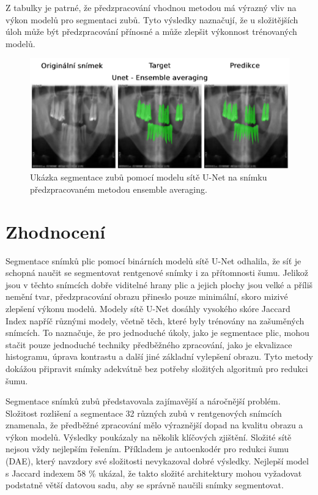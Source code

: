 \documentclass[male,czech,api_ing]{thesis}
\begin{document}
Z tabulky je patrné, že předzpracování vhodnou metodou má výrazný vliv na výkon modelů pro segmentaci zubů. Tyto výsledky naznačují, že u složitějších úloh může být předzpracování přínosné a může zlepšit výkonnost trénovaných modelů.

\begin{figure}[h]
    \centering
    \includegraphics[width=\linewidth]{Prilohy/Obrazky/MulticlassUnetEnsemble.png}
    \caption{Ukázka segmentace zubů pomocí modelu sítě U-Net na snímku předzpracovaném metodou ensemble averaging.}
    \label{fig:MulticlassUnet}
\end{figure}

\chapter{Zhodnocení} 
Segmentace snímků plic pomocí binárních modelů sítě U-Net odhalila, že síť je schopná naučit se segmentovat rentgenové snímky i za přítomnosti šumu. Jelikož jsou v těchto snímcích dobře viditelné hrany plic a jejich plochy jsou velké a příliš nemění tvar, předzpracování obrazu přineslo pouze minimální, skoro mizivé zlepšení výkonu modelů. Modely sítě U-Net dosáhly vysokého skóre Jaccard Index napříč různými modely, včetně těch, které byly trénovány na zašuměných snímcích. To naznačuje, že pro jednoduché úkoly, jako je segmentace plic, mohou stačit pouze jednoduché techniky předběžného zpracování, jako je ekvalizace histogramu, úprava kontrastu a další jiné základní vylepšení obrazu. Tyto metody dokážou připravit snímky adekvátně bez potřeby složitých algoritmů pro redukci šumu.

Segmentace snímků zubů představovala zajímavější a náročnější problém. Složitost rozlišení a segmentace 32 různých zubů v rentgenových snímcích znamenala, že předběžné zpracování mělo výraznější dopad na kvalitu obrazu a výkon modelů. Výsledky poukázaly na několik klíčových zjištění. Složité sítě nejsou vždy nejlepším řešením. Příkladem je autoenkodér pro redukci šumu (DAE), který navzdory své složitosti nevykazoval dobré výsledky. Nejlepší model s Jaccard indexem 58 \% ukázal, že takto složité architektury mohou vyžadovat podstatně větší datovou sadu, aby se správně naučili snímky segmentovat.
\end{document}
